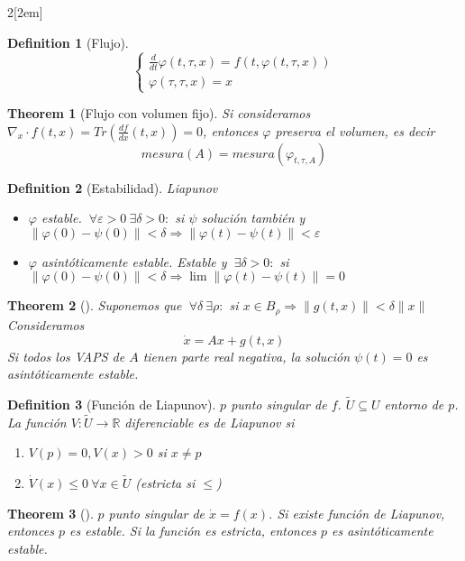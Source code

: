 \documentclass{myclass}
\newtheorem*{definition}{Definition}
\newtheorem*{theorem}{Theorem}
\begin{document}
\begin{multicols}{2}[\columnsep2em]
\begin{definition}[Flujo]
\[
\begin{cases}
  \frac{d }{d t} \varphi (t, \tau , x) = f(t, \varphi (t, \tau , x))\\
  \varphi (\tau, \tau , x) = x
\end{cases}
\] 
\end{definition}

\begin{theorem}[Flujo con volumen fijo] Si consideramos $\nabla_{x}\cdot f(t, x) = Tr(\frac{d f}{d x} (t, x)) = 0$, entonces $\varphi $ preserva el volumen, es decir
  \[
  mesura(A) = mesura(\varphi_{t, \tau , A})
  \] 
\end{theorem}

\begin{definition}[Estabilidad] Liapunov
  \begin{itemize}[topsep=-6pt, itemsep=0pt]
    \item $\varphi $ estable. $\ \forall \varepsilon >0 \ \exists \delta>0: $ si $\psi $ solución también y  $\|\varphi (0)-\psi (0)\|<\delta \Rightarrow \|\varphi (t)-\psi (t)\|<\varepsilon $ 
	\item $\varphi $ asintóticamente estable. Estable y $\ \exists \delta>0: $ si $\|\varphi (0)-\psi (0)\|<\delta \Rightarrow \lim \|\varphi (t)-\psi (t)\| = 0$
  \end{itemize}
\end{definition}

\begin{theorem}[] Suponemos que $\ \forall \delta \ \exists \rho : $ si $ x\in B_{\rho } \Rightarrow \|g(t, x)\|<\delta\|x\| $ Consideramos
  \[
  \dot{x} = Ax + g(t, x)
  \] 
  Si todos los VAPS de $A$ tienen parte real negativa, la solución $\psi (t) = 0$ es asintóticamente estable.
\end{theorem}

\begin{definition}[Función de Liapunov] $p$ punto singular de $f$. $\tilde{U}\subseteq U$ entorno de $p$. La función $V: \tilde{U}\to \mathbb{R}$ diferenciable es de Liapunov si
  \begin{enumerate}[topsep=-6pt, itemsep=0pt]
    \item $V(p)=0, V(x)>0$ si $x\neq p$
	\item $\dot{V}(x)\le 0 \ \forall x\in \tilde{U}$ (estricta si $\le $)
  \end{enumerate}
\end{definition}

\begin{theorem}[] $p$ punto singular de  $\dot{x}=f(x)$. Si existe función de Liapunov, entonces $p$ es estable. Si la función es estricta, entonces  $p$ es asintóticamente estable.
\end{theorem}


\end{multicols}
\end{document}

